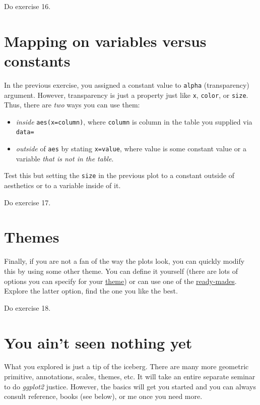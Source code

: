 \documentclass[
]{book}
\providecommand{\tightlist}{%
  \setlength{\itemsep}{0pt}\setlength{\parskip}{0pt}}
\begin{document}
Do exercise 16.

\hypertarget{mapping-on-variables-versus-constants}{%
\section{Mapping on variables versus constants}\label{mapping-on-variables-versus-constants}}

In the previous exercise, you assigned a constant value to \texttt{alpha} (transparency) argument. However, transparency is just a property just like \texttt{x}, \texttt{color}, or \texttt{size}. Thus, there are \emph{two} ways you can use them:

\begin{itemize}
\tightlist
\item
  \emph{inside} \texttt{aes(x=column)}, where \texttt{column} is column in the table you supplied via \texttt{data=}
\item
  \emph{outside} of \texttt{aes} by stating \texttt{x=value}, where value is some constant value or a variable \emph{that is not in the table}.
\end{itemize}

Test this but setting the \texttt{size} in the previous plot to a constant outside of aesthetics or to a variable inside of it.

Do exercise 17.

\hypertarget{themes}{%
\section{Themes}\label{themes}}

Finally, if you are not a fan of the way the plots look, you can quickly modify this by using some other theme. You can define it yourself (there are lots of options you can specify for your \href{https://ggplot2.tidyverse.org/reference/theme.html}{theme}) or can use one of the \href{https://ggplot2.tidyverse.org/reference/ggtheme.html}{ready-mades}. Explore the latter option, find the one you like the best.

Do exercise 18.

\hypertarget{you-aint-seen-nothing-yet}{%
\section{You ain't seen nothing yet}\label{you-aint-seen-nothing-yet}}

What you explored is just a tip of the iceberg. There are many more geometric primitive, annotations, scales, themes, etc. It will take an entire separate seminar to do \emph{ggplot2} justice. However, the basics will get you started and you can always consult reference, books (see below), or me once you need more.
\end{document}
